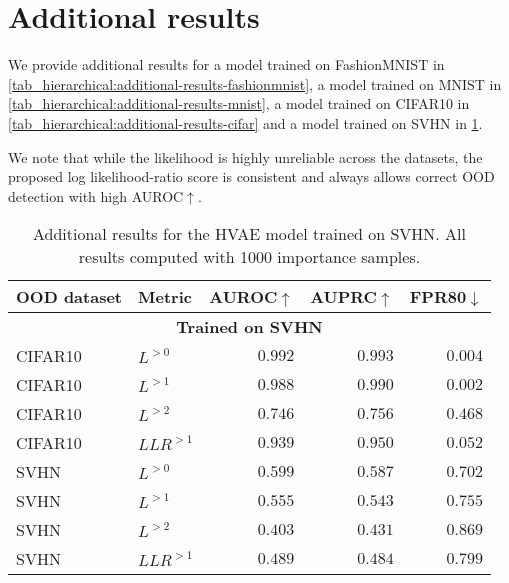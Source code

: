 {\section{Additional results}
We provide additional results for a model trained on FashionMNIST in \cref{tab_hierarchical:additional-results-fashionmnist}, a model trained on MNIST in \cref{tab_hierarchical:additional-results-mnist}, a model trained on CIFAR10 in \cref{tab_hierarchical:additional-results-cifar} and a model trained on SVHN in \cref{tab_hierarchical:additional-results-svhn}.

We note that while the likelihood is highly unreliable across the datasets, the proposed log likelihood-ratio score is consistent and always allows correct OOD detection with high AUROC$\uparrow$.

\begin{table}[t]
    \centering
    \begin{tabular}{llrrr}
        \toprule
        OOD dataset & Metric & AUROC$\uparrow$ & AUPRC$\uparrow$ & FPR80$\downarrow$ \\
        \midrule
        \multicolumn{5}{c}{\textbf{Trained on SVHN}} \\
        \midrule
        CIFAR10            &  $L^{>0}$         &  $0.992$  &  $0.993$  &  $0.004$  \\
        CIFAR10            &  $L^{>1}$         &  $0.988$  &  $0.990$  &  $0.002$  \\
        CIFAR10            &  $L^{>2}$         &  $0.746$  &  $0.756$  &  $0.468$  \\
        CIFAR10            &  $LLR^{>1}$       &  $0.939$  &  $0.950$  &  $0.052$  \\
        \midrule
        SVHN               &  $L^{>0}$         &  $0.599$  &  $0.587$  &  $0.702$  \\
        SVHN               &  $L^{>1}$         &  $0.555$  &  $0.543$  &  $0.755$  \\
        SVHN               &  $L^{>2}$         &  $0.403$  &  $0.431$  &  $0.869$  \\
        SVHN               &  $LLR^{>1}$       &  $0.489$  &  $0.484$  &  $0.799$  \\
        \bottomrule
    \end{tabular}
    \caption[Additional results for the HVAE model trained on SVHN]{Additional results for the HVAE model trained on SVHN. All results computed with 1000 importance samples.}
    \label{tab_hierarchical:additional-results-svhn}
\end{table}

}
